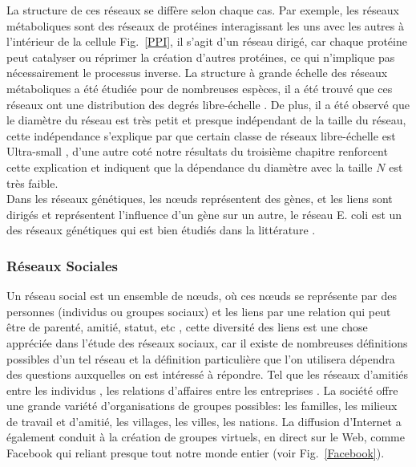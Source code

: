  La structure de ces réseaux se diffère selon chaque cas. Par exemple, les réseaux métaboliques sont des réseaux de protéines interagissant les uns avec les autres à l'intérieur de la cellule Fig.~\ref{PPI}, il s'agit d'un réseau dirigé, car chaque protéine peut catalyser ou réprimer la création d'autres protéines, ce qui n'implique pas nécessairement le processus inverse. La structure à grande échelle des réseaux métaboliques a été étudiée pour de nombreuses espèces, il a été trouvé que ces réseaux ont une distribution des degrés libre-échelle \cite{Je-al2000}. De plus, il a été observé que le diamètre du réseau est très petit et presque indépendant de la taille du réseau, cette indépendance s'explique par que certain classe de réseaux libre-échelle est Ultra-small \cite{Cohen-Havlin2003,Do-al2003,ChL2003}, d'une autre coté notre résultats du troisième chapitre renforcent cette explication et indiquent que la dépendance du diamètre avec la taille $N$ est très faible.\\ Dans les réseaux génétiques, les nœuds représentent des gènes, et les liens sont dirigés  et représentent l'influence d'un gène sur un autre, le réseau E. coli est un des réseaux génétiques qui est bien étudiés dans la littérature \cite{Mi-al2002}.


  \subsubsection{Réseaux Sociales}
  Un réseau social est un ensemble de nœuds, où ces nœuds se représente par des  personnes  (individus ou groupes sociaux) et les liens par une relation qui peut être de parenté, amitié, statut, etc \cite{JS2000}, cette diversité des liens est une chose appréciée dans l'étude des réseaux sociaux, car il existe de nombreuses définitions possibles d'un tel réseau et la définition particulière que l'on utilisera dépendra des questions auxquelles on est intéressé à répondre. Tel que les réseaux d'amitiés entre les individus \cite{WW1977,Mo1934}, les relations d'affaires entre les entreprises \cite{JP1977}.
  La société offre une grande variété d'organisations de groupes possibles: les familles, les milieux de travail et d'amitié, les villages, les villes, les nations. La diffusion d'Internet a également conduit à la création de groupes virtuels, en direct sur le Web, comme Facebook qui reliant presque tout  notre monde entier (voir Fig.~\ref{Facebook}).
  
